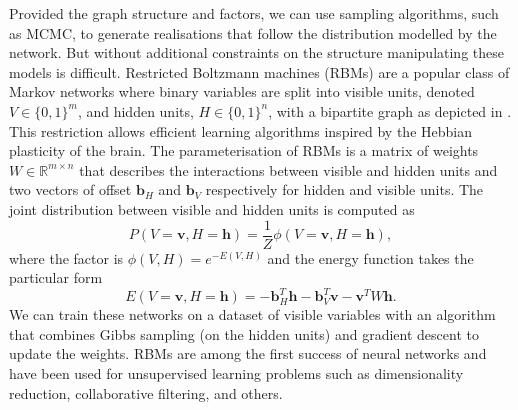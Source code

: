 Provided the graph structure and factors, we can use sampling algorithms, such as MCMC, to generate realisations that follow the distribution modelled by the network. But without additional constraints on the structure manipulating these models is difficult.
Restricted Boltzmann machines (RBMs) are a popular class of Markov networks where binary variables are split into visible units, denoted $V \in \{0, 1\}^m$, and hidden units, $H \in \{0, 1\}^n$, with a bipartite graph as depicted in . This restriction allows efficient learning algorithms inspired by the Hebbian plasticity of the brain. The parameterisation of RBMs is a matrix of weights $W \in \mathbb{R}^{m\times n}$ that describes the interactions between visible and hidden units and two vectors of offset $\bm{b}_H$ and $\bm{b}_V$ respectively for hidden and visible units. The joint distribution between visible and hidden units is computed as
$$ P(V=\bm{v}, H=\bm{h}) = \frac{1}{Z} \phi(V=\bm{v}, H=\bm{h}), $$
where the factor is $ \phi(V, H)=e^{-E(V, H)} $ and the energy function takes the particular form
$$ E(V=\bm{v}, H=\bm{h}) = -\bm{b}_H^T \bm{h} - \bm{b}_V^T \bm{v} - \bm{v}^T W \bm{h}.  $$
We can train these networks on a dataset of visible variables with an algorithm that combines Gibbs sampling (on the hidden units) and gradient descent to update the weights. RBMs are among the first success of neural networks and have been used for unsupervised learning problems such as dimensionality reduction, collaborative filtering, and others.
%
%
%

